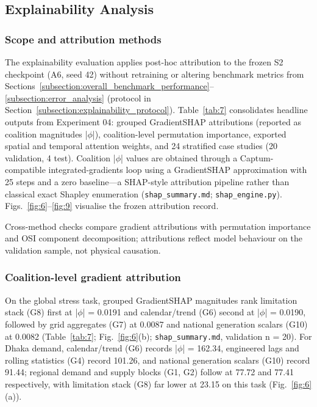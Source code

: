\subsection{Explainability Analysis}\label{subsection:explainability_analysis}

\subsubsection{Scope and attribution methods}\label{subsubsection:scope_and_attribution_methods}

The explainability evaluation applies post-hoc attribution \cite{Lundberg2017SHAP,Sundararajan2017IntegratedGradients} to the frozen S2 checkpoint (A6, seed 42) without retraining or altering benchmark metrics from Sections~\ref{subsection:overall_benchmark_performance}--\ref{subsection:error_analysis} (protocol in Section~\ref{subsection:explainability_protocol}). Table~\ref{tab:7} consolidates headline outputs from Experiment 04: grouped GradientSHAP attributions (reported as coalition magnitudes |$\phi$|), coalition-level permutation importance, exported spatial and temporal attention weights, and 24 stratified case studies (20 validation, 4 test). Coalition |$\phi$| values are obtained through a Captum-compatible integrated-gradients loop using a GradientSHAP approximation with 25 steps and a zero baseline---a SHAP-style attribution pipeline rather than classical exact Shapley enumeration (\texttt{shap\_summary.md}; \texttt{shap\_engine.py}). Figs.~\ref{fig:6}--\ref{fig:9} visualise the frozen attribution record.

Cross-method checks compare gradient attributions with permutation importance and OSI component decomposition; attributions reflect model behaviour on the validation sample, not physical causation.

\subsubsection{Coalition-level gradient attribution}\label{subsubsection:coalition_level_gradient_attribution}

On the global stress task, grouped GradientSHAP magnitudes rank limitation stack (G8) first at |$\phi$| = 0.0191 and calendar/trend (G6) second at |$\phi$| = 0.0190, followed by grid aggregates (G7) at 0.0087 and national generation scalars (G10) at 0.0082 (Table~\ref{tab:7}; Fig.~\ref{fig:6}(b); \texttt{shap\_summary.md}, validation n = 20). For Dhaka demand, calendar/trend (G6) records |$\phi$| = 162.34, engineered lags and rolling statistics (G4) record 101.26, and national generation scalars (G10) record 91.44; regional demand and supply blocks (G1, G2) follow at 77.72 and 77.41 respectively, with limitation stack (G8) far lower at 23.15 on this task (Fig.~\ref{fig:6}(a)).

